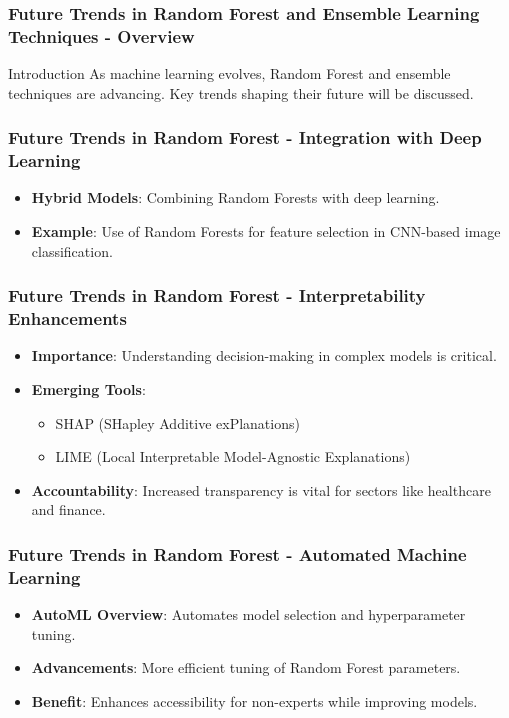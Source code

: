 \documentclass[aspectratio=169]{beamer}
\begin{document}
\begin{frame}[fragile]
    \frametitle{Future Trends in Random Forest and Ensemble Learning Techniques - Overview}
    
    \begin{block}{Introduction}
        As machine learning evolves, Random Forest and ensemble techniques are advancing. Key trends shaping their future will be discussed.
    \end{block}
\end{frame}

\begin{frame}[fragile]
    \frametitle{Future Trends in Random Forest - Integration with Deep Learning}
    
    \begin{itemize}
        \item \textbf{Hybrid Models}: Combining Random Forests with deep learning.
        \item \textbf{Example}: Use of Random Forests for feature selection in CNN-based image classification.
    \end{itemize}
\end{frame}

\begin{frame}[fragile]
    \frametitle{Future Trends in Random Forest - Interpretability Enhancements}
    
    \begin{itemize}
        \item \textbf{Importance}: Understanding decision-making in complex models is critical.
        \item \textbf{Emerging Tools}:
            \begin{itemize}
                \item SHAP (SHapley Additive exPlanations)
                \item LIME (Local Interpretable Model-Agnostic Explanations)
            \end{itemize}
        \item \textbf{Accountability}: Increased transparency is vital for sectors like healthcare and finance.
    \end{itemize}
\end{frame}

\begin{frame}[fragile]
    \frametitle{Future Trends in Random Forest - Automated Machine Learning}
    
    \begin{itemize}
        \item \textbf{AutoML Overview}: Automates model selection and hyperparameter tuning.
        \item \textbf{Advancements}: More efficient tuning of Random Forest parameters.
        \item \textbf{Benefit}: Enhances accessibility for non-experts while improving models.
    \end{itemize}
\end{frame}
\end{document}
